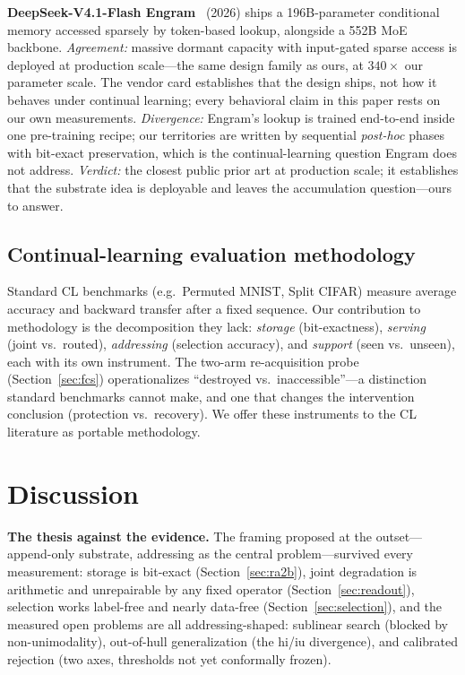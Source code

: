 \documentclass[11pt]{article}
\theoremstyle{definition}\newtheorem{definition}{Definition}
\theoremstyle{remark}\newtheorem{remark}{Remark}
\begin{document}
\textbf{DeepSeek-V4.1-Flash Engram}~\cite{engram} (2026) ships a 196B-parameter
conditional memory accessed sparsely by token-based lookup, alongside a 552B MoE
backbone. \emph{Agreement:} massive dormant capacity with input-gated sparse access is
deployed at production scale---the same design family as ours, at $340\times$ our
parameter scale. The vendor card establishes that the design ships, not how it behaves
under continual learning; every behavioral claim in this paper rests on our own
measurements. \emph{Divergence:} Engram's
lookup is trained end-to-end inside one pre-training recipe; our territories are written
by sequential \emph{post-hoc} phases with bit-exact preservation, which is the
continual-learning question Engram does not address. \emph{Verdict:} the closest public
prior art at production scale; it establishes that the substrate idea is deployable and
leaves the accumulation question---ours to answer.

\subsection{Continual-learning evaluation methodology}
\label{sec:prior:method}

Standard CL benchmarks (e.g.\ Permuted MNIST, Split CIFAR) measure average accuracy and
backward transfer after a fixed sequence. Our contribution to methodology is the
decomposition they lack: \emph{storage} (bit-exactness), \emph{serving} (joint vs.\ routed),
\emph{addressing} (selection accuracy), and \emph{support} (seen vs.\ unseen), each with
its own instrument. The two-arm re-acquisition probe (Section~\ref{sec:fcs}) operationalizes
``destroyed vs.\ inaccessible''---a distinction standard benchmarks cannot make, and one
that changes the intervention conclusion (protection vs.\ recovery). We offer these
instruments to the CL literature as portable methodology.

\section{Discussion}
\label{sec:discussion}

\textbf{The thesis against the evidence.} The framing proposed at the outset---append-only substrate,
addressing as the central problem---survived every measurement: storage is bit-exact
(Section~\ref{sec:ra2b}), joint degradation is arithmetic and unrepairable by any fixed
operator (Section~\ref{sec:readout}), selection works label-free and nearly data-free
(Section~\ref{sec:selection}), and the measured open problems are all addressing-shaped:
sublinear search (blocked by non-unimodality), out-of-hull generalization (the hi/iu
divergence), and calibrated rejection (two axes, thresholds not yet conformally frozen).
\end{document}
